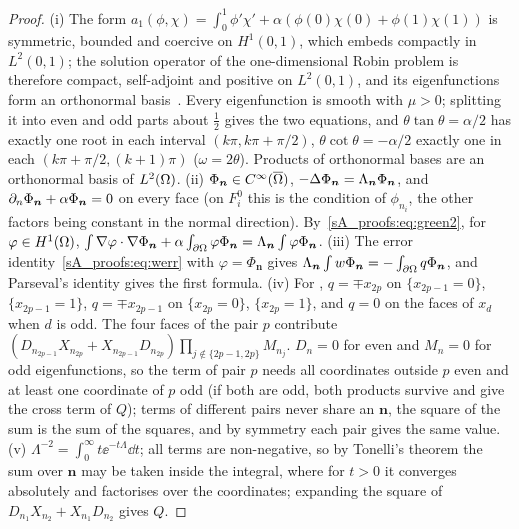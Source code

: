 \begin{proof}
(i) The form $a_1(\phi,\chi)=\int_0^1\phi'\chi'+\alpha(\phi(0)\chi(0)+\phi(1)\chi(1))$ is symmetric,
bounded and coercive on $H^1(0,1)$, which embeds compactly in $L^2(0,1)$; the solution operator of
the one-dimensional Robin problem is therefore compact, self-adjoint and positive on $L^2(0,1)$, and
its eigenfunctions form an orthonormal basis~\citep[Sec.~6.5 and App.~D]{evans2010}. Every
eigenfunction is smooth with $\mu>0$; splitting it into even and odd parts about $\frac12$ gives the
two equations, and $\theta\tan\theta=\alpha/2$ has exactly one root in each interval
$(k\pi,k\pi+\pi/2)$, $\theta\cot\theta=-\alpha/2$ exactly one in each $(k\pi+\pi/2,(k+1)\pi)$
($\omega=2\theta$). Products of orthonormal bases are an orthonormal basis of $L^2(\Omega)$.
(ii) $\Phi_{\boldsymbol n}\in C^\infty(\overline{\Omega})$, $-\Delta\Phi_{\boldsymbol n}=\Lambda_{\boldsymbol n}\Phi_{\boldsymbol n}$,
and $\partial_n\Phi_{\boldsymbol n}+\alpha\Phi_{\boldsymbol n}=0$ on every face (on $F_i^0$ this is the
condition of $\phi_{n_i}$, the other factors being constant in the normal direction).
By~\eqref{sA_proofs:eq:green2}, for $\varphi\in H^1(\Omega)$,
$\int\nabla\varphi\cdot\nabla\Phi_{\boldsymbol n}+\alpha\int_{\partial\Omega}\varphi\Phi_{\boldsymbol n}=\Lambda_{\boldsymbol n}\int\varphi\Phi_{\boldsymbol n}$.
(iii) The error identity~\eqref{sA_proofs:eq:werr} with $\varphi=\Phi_{\boldsymbol n}$ gives
$\Lambda_{\boldsymbol n}\int w\Phi_{\boldsymbol n}=-\int_{\partial\Omega}q\Phi_{\boldsymbol n}$, and Parseval's
identity gives the first formula.
(iv) For \Pone, $q=\mp x_{2p}$ on $\{x_{2p-1}=0\}$, $\{x_{2p-1}=1\}$, $q=\mp x_{2p-1}$ on
$\{x_{2p}=0\}$, $\{x_{2p}=1\}$, and $q=0$ on the faces of $x_d$ when $d$ is odd. The four faces of the
pair $p$ contribute $(D_{n_{2p-1}}X_{n_{2p}}+X_{n_{2p-1}}D_{n_{2p}})\prod_{j\notin\{2p-1,2p\}}M_{n_j}$.
$D_n=0$ for even and $M_n=0$ for odd eigenfunctions, so the term of pair $p$ needs all coordinates
outside $p$ even and at least one coordinate of $p$ odd (if both are odd, both products survive and
give the cross term of $Q$); terms of different pairs never share an
$\boldsymbol n$, the square of the sum is the sum of the squares, and by symmetry each pair gives the
same value.
(v) $\Lambda^{-2}=\int_0^\infty t\ee^{-t\Lambda}\dd t$; all terms are non-negative, so by Tonelli's
theorem the sum over $\boldsymbol n$ may be taken inside the integral, where for $t>0$ it converges
absolutely and factorises over the coordinates; expanding the square of
$D_{n_1}X_{n_2}+X_{n_1}D_{n_2}$ gives $Q$.
\end{proof}
